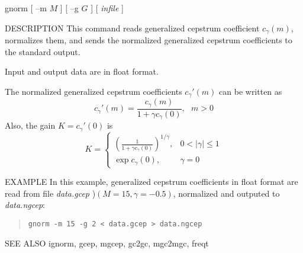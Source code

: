 
\begin{synopsis}
\item [gnorm] [ --m $M$ ] [ --g $G$ ] [ {\em infile} ]
\end{synopsis}

\begin{qsection}{DESCRIPTION}
This command reads generalized cepstrum coefficient $c_\gamma(m)$,
normalizes them, and sends the normalized generalized
cepstrum coefficients to the standard output.
\par
Input and output data are in float format.
\par
The normalized generalized cepstrum coefficients $c_\gamma'(m)$
can be written as
\begin{displaymath}
c_\gamma'(m) = \frac{c_\gamma(m)}{1+\gamma c_\gamma(0)}, ~~~m>0
\end{displaymath}
Also, the gain $K = c_\gamma'(0)$ is
\begin{displaymath}
K = \left\{
	\begin{array}{ll} \displaystyle
	  \left(\frac{1}{1+\gamma c_\gamma(0)}\right)^{1/\gamma},
		& 0<|\gamma|\leq 1 \\ \displaystyle
	  \exp c_\gamma(0),  & \gamma=0
	\end{array} \right.
\end{displaymath}
\end{qsection}

\begin{options}
\end{options}

\begin{qsection}{EXAMPLE}
In this example, generalized cepstrum coefficients in float format
are read from file {\em data.gcep} )$(M=15, \gamma=-0.5)$,
normalized and outputed to {\em data.ngcep}:
\begin{quote}
 \verb!gnorm -m 15 -g 2 < data.gcep > data.ngcep!
\end{quote} 
\end{qsection}

\begin{qsection}{SEE ALSO}
 ignorm, gcep, mgcep, gc2gc, mgc2mgc, freqt
\end{qsection}
